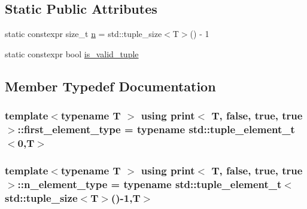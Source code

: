 \subsection*{Static Public Attributes}
\begin{DoxyCompactItemize}
\item 
static constexpr size\+\_\+t \hyperlink{structprint_3_01T_00_01false_00_01true_00_01true_01_4_a2206343ff3fdd5212f3984384d1d59dc}{n} = std\+::tuple\+\_\+size$<$T$>$() -\/ 1
\item 
static constexpr bool \hyperlink{structprint_3_01T_00_01false_00_01true_00_01true_01_4_ac26cb1e1f2d4e622fc9bd7ba97555dc4}{is\+\_\+valid\+\_\+tuple}
\end{DoxyCompactItemize}


\subsection{Member Typedef Documentation}
\subsubsection[{\texorpdfstring{first\+\_\+element\+\_\+type}{first_element_type}}]{\setlength{\rightskip}{0pt plus 5cm}template$<$typename T $>$ using {\bf print}$<$ T, false, true, true $>$\+::{\bf first\+\_\+element\+\_\+type} =  typename std\+::tuple\+\_\+element\+\_\+t$<$0,T$>$}\hypertarget{structprint_3_01T_00_01false_00_01true_00_01true_01_4_a2dae0d9d3db0a28ae73051bef2394aaa}{}\label{structprint_3_01T_00_01false_00_01true_00_01true_01_4_a2dae0d9d3db0a28ae73051bef2394aaa}
\subsubsection[{\texorpdfstring{n\+\_\+element\+\_\+type}{n_element_type}}]{\setlength{\rightskip}{0pt plus 5cm}template$<$typename T $>$ using {\bf print}$<$ T, false, true, true $>$\+::{\bf n\+\_\+element\+\_\+type} =  typename std\+::tuple\+\_\+element\+\_\+t$<$std\+::tuple\+\_\+size$<$T$>$()-\/1,T$>$}\hypertarget{structprint_3_01T_00_01false_00_01true_00_01true_01_4_a6b6bfb81869a40026880ebd0d82cd25a}{}\label{structprint_3_01T_00_01false_00_01true_00_01true_01_4_a6b6bfb81869a40026880ebd0d82cd25a}


